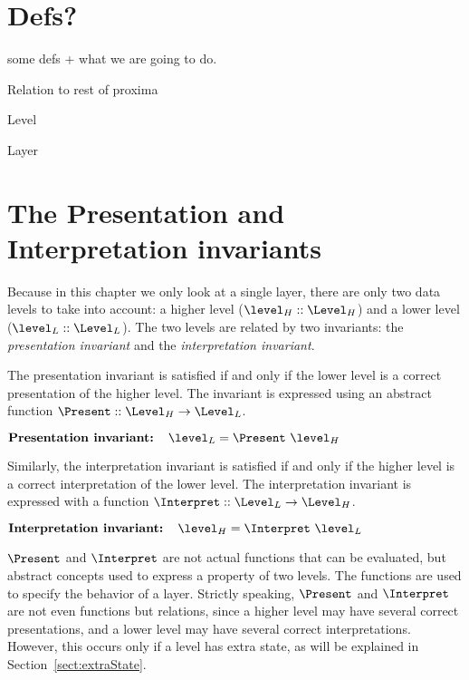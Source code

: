 %																
%																
%																
\section{Defs?}

some defs + what we are going to do.

Relation to rest of proxima

Level

Layer


%																
%																
%																
\section{The Presentation and Interpretation invariants}


Because in this chapter we only look at a single layer, there are only two data levels to take into account: a higher level ($\level_{H} :: \Level_{H}$) and a lower level ($\level_{L} :: \Level_{L}$). The two levels are related by two invariants: the {\em presentation invariant} and the {\em interpretation invariant}. 

The presentation invariant is satisfied if and only if the lower level is a correct presentation of the higher level. The invariant is expressed using an abstract function 
$\Present ::  \Level_{H} \rightarrow \Level_{L}$.

\begin{small}\begin{math}
\text{\bf Presentation invariant:~~~} \level_{L} = \Present~\level_{H}\\
\end{math}\end{small}

Similarly, the interpretation invariant is satisfied if and only if the higher level is a correct interpretation of the lower level. The interpretation invariant is expressed with a function 
$\Interpret ::  \Level_{L} \rightarrow \Level_{H}$.

\begin{small}\begin{math}
\text{\bf Interpretation invariant:~~~} \level_{H} = \Interpret~\level_{L}\\
\end{math}\end{small}

$\Present$ and $\Interpret$ are not actual functions that can be evaluated, but abstract concepts used to express a property of two levels. The functions are used to specify the behavior of a layer.
Strictly speaking, $\Present$ and $\Interpret$ are not even functions but relations, since a higher level may have several correct presentations, and a lower level may have several correct interpretations. However, this occurs only if a level has extra state, as will be explained in Section~\ref{sect:extraState}.

